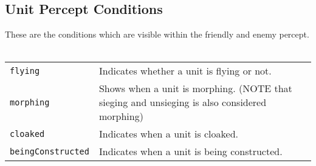 \subsection{Unit Percept Conditions}
These are the conditions which are visible within the friendly and enemy percept.\\
\\
\label{unitConditions}
\begin{tabularx}{\textwidth}{lX}
\verb|flying| & Indicates whether a unit is flying or not. \\
\verb|morphing| & Shows when a unit is morphing. (NOTE that sieging and unsieging is also considered morphing) \\
\verb|cloaked| & Indicates when a unit is cloaked. \\
\verb|beingConstructed| & Indicates when a unit is being constructed. \\
\end{tabularx} \\